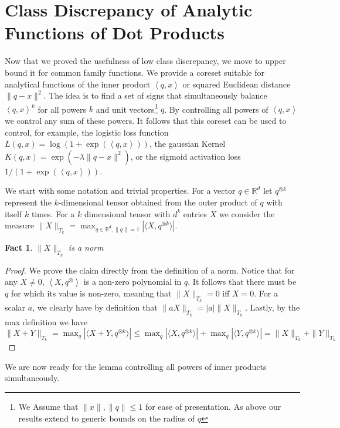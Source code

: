 \documentclass[anon,12pt]{colt2019} %
\newtheorem{fact}[theorem]{Fact}
\newcommand{\ip}[1]{\left \langle #1 \right \rangle}
\newcommand{\R}{\mathbb{R}}
\begin{document}
{\section{Class Discrepancy of Analytic Functions of Dot Products} \label{sec:analytic}

Now that we proved the usefulness of low class discrepancy, we move to upper bound it for common family functions. We provide a coreset suitable for analytical functions of the inner product $\ip{q,x}$ or squared Euclidean distance $\|q-x\|^2$. 
%
The idea is to find a set of signs that simultaneously balance $\ip{q,x}^k$ for all powers $k$ and unit vectors\footnote{We Assume that $\|x\|,\|q\| \leq 1$ for ease of presentation. As above our results extend to generic bounds on the radius of $q$} $q$. By controlling all powers of $\ip{q,x}$ we control any sum of these powers. It follows that this coreset can be used to control, for example, the logistic loss function $L(q,x) = \log(1+\exp(\ip{q,x}))$, the gaussian Kernel $K(q,x) = \exp(-\lambda \|q-x\|^2)$, or the sigmoid activation loss $1/(1 + \exp(\ip{q,x}))$.

We start with some notation and trivial properties. 
For a vector $q \in \R^d$ let $q^{\otimes k}$ represent the $k$-dimensional tensor obtained from the outer product of $q$ with itself $k$ times. For a $k$ dimensional tensor with $d^k$ entries $X$ we consider the measure
$\|X\|_{T_k} = \max_{q \in \R^d, \|q\|=1} \left| \langle X, q^{\otimes k}\rangle \right|$.
\begin{fact}
$\|X\|_{T_k}$ is a norm
\end{fact}
\begin{proof}
We prove the claim directly from the definition of a norm.
Notice that for any $X \neq 0$, $\ip{X, q^{\otimes}}$ is a non-zero polynomial in $q$. It follows that there must be $q$ for which its value is non-zero, meaning that $\|X\|_{T_k}=0$ iff $X=0$. For a scalar $a$, we clearly have by definition that
$\|aX\|_{T_k} = |a|\|X\|_{T_k}$.  Lastly, by the max definition we  have
$ \|X+Y\|_{T_k} =  \max_q \left| \langle X+Y, q^{\otimes k}\rangle \right| \leq 
\max_q \left| \langle X, q^{\otimes k}\rangle \right| + \max_q\left| \langle Y, q^{\otimes k}\rangle \right| = \|X\|_{T_k} + \|Y\|_{T_k}$
\end{proof}

We are now ready for the lemma controlling all powers of inner products simultaneously. 

}
\end{document}
